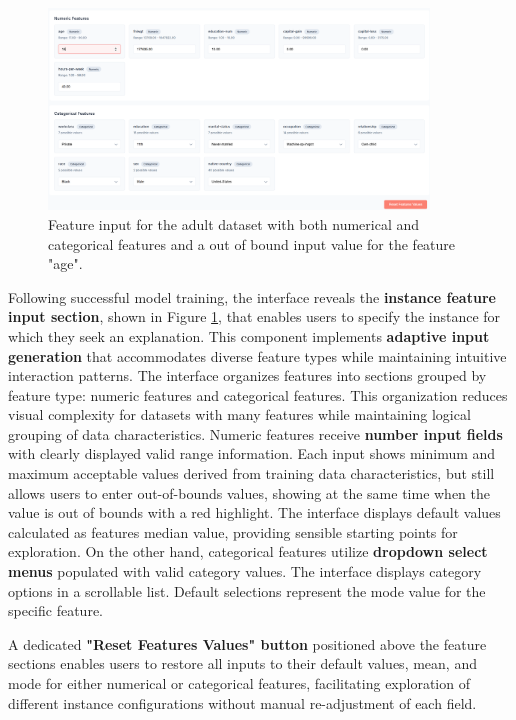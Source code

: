 \begin{figure}[htbp]
  \centering
  \includegraphics[width=0.9\textwidth]{images/featuresInputPanel.png}
  \caption{Feature input for the adult dataset with both numerical and categorical features and a out of bound input value for the feature "age".}
  \label{fig:featureInput}
\end{figure}

Following successful model training, the interface reveals the \textbf{instance feature input section}, shown in Figure \ref{fig:featureInput}, that enables users to specify the instance for which they seek an explanation. This component implements \textbf{adaptive input generation} that accommodates diverse feature types while maintaining intuitive interaction patterns.
% 
The interface organizes features into sections grouped by feature type: numeric features and categorical features. This organization reduces visual complexity for datasets with many features while maintaining logical grouping of data characteristics.
% 
Numeric features receive \textbf{number input fields} with clearly displayed valid range information. Each input shows minimum and maximum acceptable values derived from training data characteristics, but still allows users to enter out-of-bounds values, showing at the same time when the value is out of bounds with a red highlight. The interface displays default values calculated as features median value, providing sensible starting points for exploration.
% 
On the other hand,
categorical features utilize \textbf{dropdown select menus} populated with valid category values. The interface displays category options in a scrollable list. Default selections represent the mode value for the specific feature.

A dedicated \textbf{"Reset Features Values" button} positioned above the feature sections enables users to restore all inputs to their default values, mean, and mode for either numerical or categorical features, facilitating exploration of different instance configurations without manual re-adjustment of each field.

